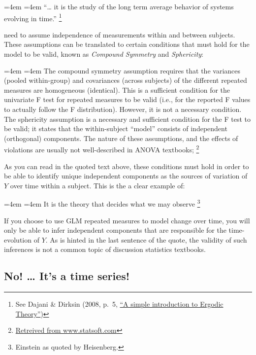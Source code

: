 \documentclass[]{book}
\let\rmarkdownfootnote\footnote%
\def\footnote{\protect\rmarkdownfootnote}
\renewenvironment{quote}{%
  \par \small \medskip \block
  \leftskip=4em \rightskip=4em%
  \noindent \ignorespaces}{%
  \par \medskip
  }
\begin{document}
\begin{quote}
``\ldots{} it is the study of the long term average behavior of systems
evolving in time.'' \footnote{See Dajani \& Dirksin (2008, p.~5,
  \href{http://www.staff.science.uu.nl/~kraai101/lecturenotes2009.pdf}{``A
  simple introduction to Ergodic Theory''})}
\end{quote}

need to assume independence of measurements within and between subjects.
These assumptions can be translated to certain conditions that must hold
for the model to be valid, known as \emph{Compound Symmetry} and
\emph{Sphericity}:

\begin{quote}
The compound symmetry assumption requires that the variances (pooled
within-group) and covariances (across subjects) of the different
repeated measures are homogeneous (identical). This is a sufficient
condition for the univariate F test for repeated measures to be valid
(i.e., for the reported F values to actually follow the F distribution).
However, it is not a necessary condition. The sphericity assumption is a
necessary and sufficient condition for the F test to be valid; it states
that the within-subject ``model'' consists of independent (orthogonal)
components. The nature of these assumptions, and the effects of
violations are usually not well-described in ANOVA textbooks; \footnote{\href{https://www.statsoft.com/Textbook/ANOVA-MANOVA\#sphericity}{Retreived
  from www.statsoft.com}}
\end{quote}

As you can read in the quoted text above, these conditions must hold in
order to be able to identify unique independent components as the
sources of variation of \(Y\) over time within a subject. This is the a
clear example of:

\begin{quote}
It is the theory that decides what we may observe \footnote{Einstein as
  quoted by Heisenberg.}
\end{quote}

If you choose to use GLM repeated measures to model change over time,
you will only be able to infer independent components that are
responsible for the time-evolution of \(Y\). As is hinted in the last
sentence of the quote, the validity of such inferences is not a common
topic of discussion statistics textbooks.

\subsection*{\texorpdfstring{\textbf{No! \ldots{} It's a time
series!}}{No! \ldots{} It's a time series!}}\label{no-its-a-time-series}
\end{document}
